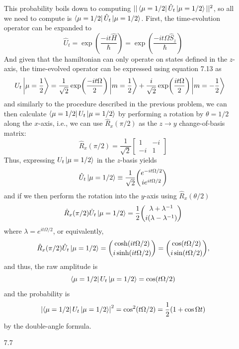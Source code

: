 \begin{enumerate}
  This probability boils down to computing $||\bra{\mu = 1/2} \hat{U}_t \ket{\mu = 1/2}||^2$, so all we need to compute is $\bra{\mu = 1/2} \hat{U}_t \ket{\mu = 1/2}$. First, the time-evolution operator can be expanded to
  $$\hat{U}_t = \exp(\frac{-i t \hat{H}}{\hbar}) = \exp(\frac{-i t \Omega \hat{S}_z}{\hbar})$$
  And given that the hamiltonian can only operate on states defined in the $z$-axis, the time-evolved operator can be expressed using equation 7.13 as
  \begin{align*}
    U_t \ket{\mu = \frac{1}{2}} &= \frac{1}{\sqrt{2}} \exp(\frac{-it \Omega}{2}) \ket{m=\frac{1}{2}} + \frac{i}{\sqrt{2}} \exp(\frac{it\Omega}{2}) \ket{m=-\frac{1}{2}}
  \end{align*}
  and similarly to the procedure described in the previous problem, we can
  then calculate $\bra{\mu = 1/2} U_t \ket{\mu = 1/2}$ by performing a
  rotation by $\theta=1/2$ along the $x$-axis, i.e., we can use
  $\hat{R}_x(\pi/2)$ as the $z \to y$ change-of-basis matrix:
  \begin{equation*}
    \hat{R}_x(\pi/2) = \frac{1}{\sqrt{2}} \begin{bmatrix}
      1 & -i \\ -i & 1
    \end{bmatrix}
  \end{equation*}
  Thus, expressing $U_t \ket{\mu = 1/2}$ in the $z$-basis yields
  \begin{equation*}
    \hat{U}_t \ket{\mu = 1/2} \equiv \frac{1}{\sqrt{2}} \binom{ e^{-it\Omega/2} }{ ie^{it\Omega/2} }
  \end{equation*}
  and if we then perform the rotation into the $y$-axis using $\hat{R}_x(\theta/2)$
  \begin{equation*}
    \hat{R}_x(\pi/2) \hat{U}_t \ket{\mu = 1/2} = \frac{1}{2} \binom{ \lambda + \lambda^{-1} }{ i(\lambda - \lambda^{-1}) }
  \end{equation*}
  where $\lambda = e^{it\Omega/2}$, or equivalently,
  \begin{equation*}
    \hat{R}_x(\pi/2) \hat{U}_t \ket{\mu = 1/2} = \binom{ \cosh(it\Omega/2) }{ i\sinh(it\Omega/2) } = \binom{ \cos(t\Omega/2) }{ i\sin(t\Omega/2) },
  \end{equation*}
  and thus, the raw amplitude is
  $$\bra{\mu = 1/2} U_t \ket{\mu = 1/2} = \cos(t\Omega/2)$$
  and the probability is
  $$\abs{\bra{\mu = 1/2} U_t \ket{\mu = 1/2}}^2 = \cos^2(t\Omega/2) = \frac{1}{2}(1 + \cos \Omega t)$$
  by the double-angle formula.
\item[7.7] 

\end{enumerate}
